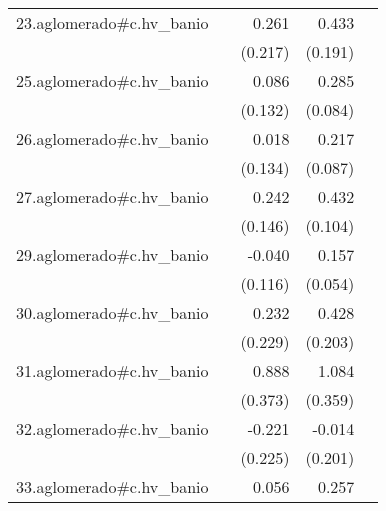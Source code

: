{\begin{longtable}{l*{4}{D{.}{.}{-1}}}
\addlinespace
23.aglomerado#c.hv\_banio&                     &       0.261         &       0.433\sym{*}  &                     \\
            &                     &     (0.217)         &     (0.191)         &                     \\
\addlinespace
25.aglomerado#c.hv\_banio&                     &       0.086         &       0.285\sym{***}&                     \\
            &                     &     (0.132)         &     (0.084)         &                     \\
\addlinespace
26.aglomerado#c.hv\_banio&                     &       0.018         &       0.217\sym{*}  &                     \\
            &                     &     (0.134)         &     (0.087)         &                     \\
\addlinespace
27.aglomerado#c.hv\_banio&                     &       0.242         &       0.432\sym{***}&                     \\
            &                     &     (0.146)         &     (0.104)         &                     \\
\addlinespace
29.aglomerado#c.hv\_banio&                     &      -0.040         &       0.157\sym{**} &                     \\
            &                     &     (0.116)         &     (0.054)         &                     \\
\addlinespace
30.aglomerado#c.hv\_banio&                     &       0.232         &       0.428\sym{*}  &                     \\
            &                     &     (0.229)         &     (0.203)         &                     \\
\addlinespace
31.aglomerado#c.hv\_banio&                     &       0.888\sym{*}  &       1.084\sym{**} &                     \\
            &                     &     (0.373)         &     (0.359)         &                     \\
\addlinespace
32.aglomerado#c.hv\_banio&                     &      -0.221         &      -0.014         &                     \\
            &                     &     (0.225)         &     (0.201)         &                     \\
\addlinespace
33.aglomerado#c.hv\_banio&                     &       0.056         &       0.257\sym{***}&                     \\

\end{longtable}}
